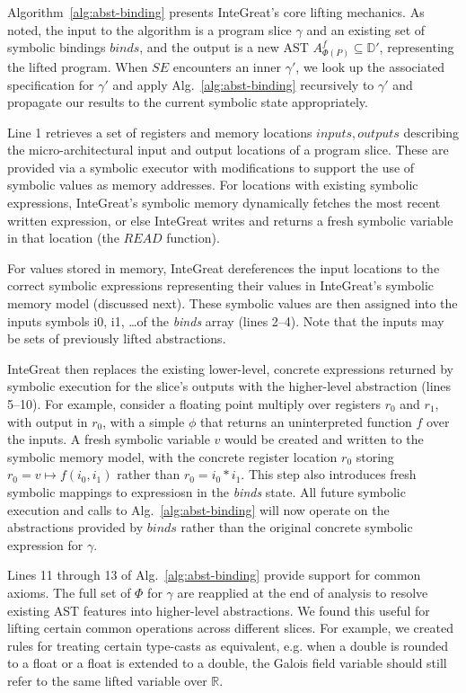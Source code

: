 Algorithm~\ref{alg:abst-binding} presents InteGreat's core lifting mechanics.
As noted, the input to the algorithm is a program slice $\gamma$ and an existing set of symbolic bindings $binds$, and the output is a new AST $A_{\Phi(P)}^{f} \subseteq \mathbb{D}'$, representing the lifted program.
When $SE$ encounters an inner $\gamma'$, we look up the associated specification for $\gamma'$ and apply Alg.~\ref{alg:abst-binding} recursively to $\gamma'$ and propagate our results to the current symbolic state appropriately.

Line 1 retrieves a set of registers and memory locations $inputs, outputs$ describing the micro-architectural input and output locations of a program slice.
These are provided via a symbolic executor with modifications to support the use of symbolic values as memory addresses.
For locations with existing symbolic expressions, InteGreat's symbolic memory dynamically fetches the most recent written expression, or else InteGreat writes and returns a fresh symbolic variable in that location (the $READ$ function).

For values stored in memory, InteGreat dereferences the input locations to the correct symbolic expressions representing their values in InteGreat's symbolic memory model (discussed next).
These symbolic values are then assigned into the inputs symbols i0, i1, \dots of the \emph{binds} array (lines 2--4).
Note that the inputs may be sets of previously lifted abstractions.

InteGreat then replaces the existing lower-level, concrete expressions returned by symbolic execution for the slice's outputs with the higher-level abstraction (lines 5--10).
For example, consider a floating point multiply over registers $r_{0}$ and $r_{1}$, with output in $r_{0}$, with a simple $\phi$ that returns an uninterpreted function $f$ over the inputs.
A fresh symbolic variable $v$ would be created and written to the symbolic memory model, with the concrete register location $r_{0}$ storing $r_{0} = v \mapsto f(i_{0},i_{1})$ rather than $r_{0} = i_{0} * i_{1}$.
This step also introduces fresh symbolic mappings to expressiosn in the \emph{binds} state.
All future symbolic execution and calls to Alg.~\ref{alg:abst-binding} will now operate on the abstractions provided by $binds$ rather than the original concrete symbolic expression for $\gamma$.

Lines 11 through 13 of Alg.~\ref{alg:abst-binding} provide support for common axioms.
The full set of $\Phi$ for $\gamma$ are reapplied at the end of analysis to resolve existing AST features into higher-level abstractions.
We found this useful for lifting certain common operations across different slices.
For example, we created rules for treating certain type-casts as equivalent, e.g. when a double is rounded to a float or a float is extended to a double, the Galois field variable should still refer to the same lifted variable over $\mathbb{R}$.

